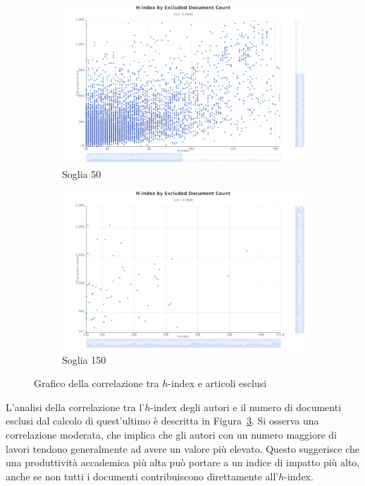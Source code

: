 \begin{figure}[ht]
    \centering
    \begin{subfigure}{0.49\textwidth}
        \includegraphics[width=\textwidth]{images/H-index-by-Excluded-Document-Count-50.pdf}
        \caption{Soglia 50}
        \label{fig:H-index-by-Excluded-Document-Count-50}
    \end{subfigure}
    \hfill
    \begin{subfigure}{0.49\textwidth}
        \includegraphics[width=\textwidth]{images/H-index-by-Excluded-Document-Count-150.pdf}
        \caption{Soglia 150}
        \label{fig:H-index-by-Excluded-Document-Count-150}
    \end{subfigure}        
    \caption{Grafico della correlazione tra $h$-index e articoli esclusi}
    \label{fig:H-index-by-Excluded-Document-Count}
\end{figure}

L'analisi della correlazione tra l'$h$-index degli autori e il numero di documenti esclusi dal calcolo di quest'ultimo è descritta in Figura~\ref{fig:H-index-by-Excluded-Document-Count}. Si osserva una correlazione moderata, che implica che gli autori con un numero maggiore di lavori tendono generalmente ad avere un valore più elevato. Questo suggerisce che una produttività accademica più alta può portare a un indice di impatto più alto, anche se non tutti i documenti contribuiscono direttamente all'$h$-index.

